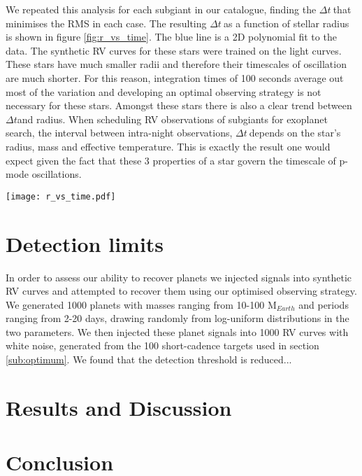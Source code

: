 \documentclass[useAMS, usenatbib]{aastex}
\newcommand{\dt}{$\Delta t$}
\begin{document}
We repeated  this analysis for each subgiant in our catalogue, finding the
\dt$~$that minimises the RMS in each case.
The resulting \dt$~$as a function of stellar radius is shown in figure
\ref{fig:r_vs_time}.
The blue line is a 2D polynomial fit to the data.
The synthetic RV curves for these stars were trained on the light curves.
These stars have much smaller radii and therefore their timescales of
oscillation are much shorter.
For this reason, integration times of 100 seconds average out most of the
variation and developing an optimal observing strategy is not necessary for
these stars.
Amongst these stars there is also a clear trend between \dt and radius.
When scheduling RV observations of subgiants for exoplanet search, the interval
between intra-night observations, \dt$~$depends on the star's radius, mass and
effective temperature.
This is exactly the result one would expect given the fact that these
3 properties of a star govern the timescale of p-mode oscillations.

\begin{figure*}
\begin{center}
\texttt{[image: r\_vs\_time.pdf]}
\caption{Radius vs \dt. This plot shows how the optimal observing interval,
\dt, varies as a function of subgiant radius. The blue line is a 2D polynomial
fit to the data.}
\label{fig:r_vs_time}
\end{center}
\end{figure*}


\section{Detection limits}
\label{section:detection}

In order to assess our ability to recover planets we injected signals into
synthetic RV curves and attempted to recover them using our optimised observing
strategy.
We generated 1000 planets with masses ranging from 10-100 M$_{Earth}$ and
periods ranging from 2-20 days, drawing randomly from log-uniform
distributions in the two parameters.
We then injected these planet signals into 1000 RV curves with white noise,
generated from the 100 short-cadence targets used in section \ref{sub:optimum}.
We found that the detection threshold is reduced...

\section{Results and Discussion}
\label{results}

\section{Conclusion}
\label{conclusion}



\end{document}
